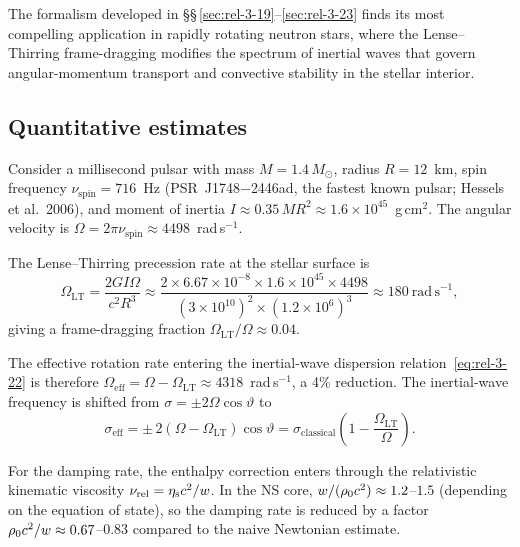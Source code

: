 The formalism developed in \S\S\,\ref{sec:rel-3-19}--\ref{sec:rel-3-23}
finds its most compelling application in rapidly rotating neutron stars,
where the Lense--Thirring frame-dragging modifies the spectrum of
inertial waves that govern angular-momentum transport and convective
stability in the stellar interior.

\subsection{Quantitative estimates}

Consider a millisecond pulsar with mass $M = 1.4\,M_{\odot}$, radius
$R = 12$~km, spin frequency $\nu_{\mathrm{spin}} = 716$~Hz
(PSR~J1748$-$2446ad, the fastest known pulsar; Hessels et al.\ 2006),
and moment of inertia $I \approx 0.35\,MR^{2} \approx
1.6 \times 10^{45}$~g\,cm$^{2}$.  The angular velocity is
$\Omega = 2\pi\nu_{\mathrm{spin}} \approx 4498$~rad\,s$^{-1}$.

The Lense--Thirring precession rate at the stellar surface is
\begin{equation}\label{eq:rel-3-app-OmLT}
  \Omega_{\mathrm{LT}}
  = \frac{2GI\Omega}{c^{2}R^{3}}
  \approx \frac{2 \times 6.67\times10^{-8} \times 1.6\times10^{45}
    \times 4498}{(3\times10^{10})^{2} \times (1.2\times10^{6})^{3}}
  \approx 180~\mathrm{rad\,s}^{-1},
\end{equation}
giving a frame-dragging fraction
$\Omega_{\mathrm{LT}}/\Omega \approx 0.04$.

The effective rotation rate entering the inertial-wave dispersion
relation~\eqref{eq:rel-3-22} is therefore
$\Omega_{\mathrm{eff}} = \Omega - \Omega_{\mathrm{LT}}
\approx 4318$~rad\,s$^{-1}$, a 4\% reduction.  The inertial-wave
frequency is shifted from $\sigma = \pm 2\Omega\cos\vartheta$ to
\begin{equation}\label{eq:rel-3-app-sigma-eff}
  \sigma_{\mathrm{eff}}
  = \pm\,2(\Omega - \Omega_{\mathrm{LT}})\cos\vartheta
  = \sigma_{\mathrm{classical}}
    \left(1 - \frac{\Omega_{\mathrm{LT}}}{\Omega}\right).
\end{equation}

For the damping rate, the enthalpy correction enters through the
relativistic kinematic viscosity
$\nu_{\mathrm{rel}} = \eta_{\mathrm{s}} c^{2}/w$.  In the NS core,
$w/(\rho_0 c^{2}) \approx 1.2$--$1.5$ (depending on the
equation of state), so the damping rate is reduced by a factor
$\rho_0 c^{2}/w \approx 0.67$--$0.83$ compared to the
naive Newtonian estimate.

